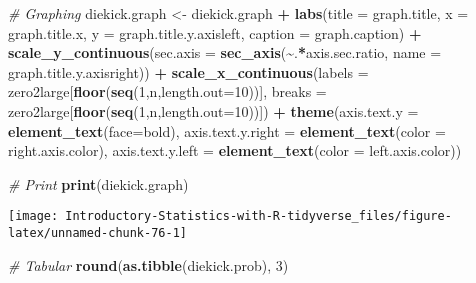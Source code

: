 \documentclass[
]{book}
\newenvironment{Shaded}{\begin{snugshade}}{\end{snugshade}}
\newcommand{\CommentTok}[1]{\textcolor[rgb]{0.56,0.35,0.01}{\textit{#1}}}
\newcommand{\DataTypeTok}[1]{\textcolor[rgb]{0.13,0.29,0.53}{#1}}
\newcommand{\DecValTok}[1]{\textcolor[rgb]{0.00,0.00,0.81}{#1}}
\newcommand{\KeywordTok}[1]{\textcolor[rgb]{0.13,0.29,0.53}{\textbf{#1}}}
\newcommand{\NormalTok}[1]{#1}
\newcommand{\OperatorTok}[1]{\textcolor[rgb]{0.81,0.36,0.00}{\textbf{#1}}}
\newcommand{\StringTok}[1]{\textcolor[rgb]{0.31,0.60,0.02}{#1}}
\begin{document}
\begin{Shaded}
\begin{Highlighting}[]
\CommentTok{\# Graphing}
\NormalTok{diekick.graph \textless{}{-}}\StringTok{ }\NormalTok{diekick.graph }\OperatorTok{+}
\StringTok{    }\KeywordTok{labs}\NormalTok{(}\DataTypeTok{title =}\NormalTok{ graph.title,}
         \DataTypeTok{x =}\NormalTok{ graph.title.x,}
         \DataTypeTok{y =}\NormalTok{ graph.title.y.axisleft,}
         \DataTypeTok{caption =}\NormalTok{ graph.caption) }\OperatorTok{+}
\StringTok{    }\KeywordTok{scale\_y\_continuous}\NormalTok{(}\DataTypeTok{sec.axis =}
                       \KeywordTok{sec\_axis}\NormalTok{(}\OperatorTok{\textasciitilde{}}\NormalTok{.}\OperatorTok{*}\NormalTok{axis.sec.ratio,}
                                \DataTypeTok{name =}\NormalTok{ graph.title.y.axisright)) }\OperatorTok{+}
\StringTok{    }\KeywordTok{scale\_x\_continuous}\NormalTok{(}\DataTypeTok{labels =}\NormalTok{ zero2large[}\KeywordTok{floor}\NormalTok{(}\KeywordTok{seq}\NormalTok{(}\DecValTok{1}\NormalTok{,n,}\DataTypeTok{length.out=}\DecValTok{10}\NormalTok{))],}
                       \DataTypeTok{breaks =}\NormalTok{ zero2large[}\KeywordTok{floor}\NormalTok{(}\KeywordTok{seq}\NormalTok{(}\DecValTok{1}\NormalTok{,n,}\DataTypeTok{length.out=}\DecValTok{10}\NormalTok{))]) }\OperatorTok{+}
\StringTok{    }\KeywordTok{theme}\NormalTok{(}\DataTypeTok{axis.text.y =} \KeywordTok{element\_text}\NormalTok{(}\DataTypeTok{face=}\StringTok{\textquotesingle{}bold\textquotesingle{}}\NormalTok{),}
          \DataTypeTok{axis.text.y.right =} \KeywordTok{element\_text}\NormalTok{(}\DataTypeTok{color =}\NormalTok{ right.axis.color),}
          \DataTypeTok{axis.text.y.left =} \KeywordTok{element\_text}\NormalTok{(}\DataTypeTok{color =}\NormalTok{ left.axis.color))}

\CommentTok{\# Print}
\KeywordTok{print}\NormalTok{(diekick.graph)}
\end{Highlighting}
\end{Shaded}

\begin{center}\texttt{[image: Introductory-Statistics-with-R-tidyverse\_files/figure-latex/unnamed-chunk-76-1]} \end{center}

\begin{Shaded}
\begin{Highlighting}[]
\CommentTok{\# Tabular}
\KeywordTok{round}\NormalTok{(}\KeywordTok{as.tibble}\NormalTok{(diekick.prob), }\DecValTok{3}\NormalTok{)}
\end{Highlighting}
\end{Shaded}
\end{document}
